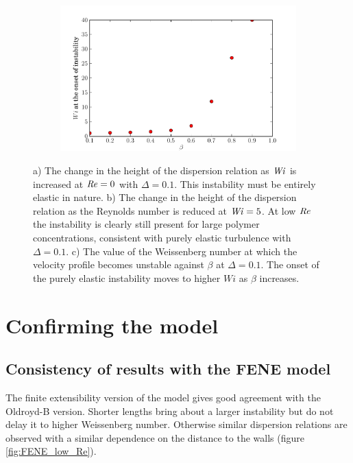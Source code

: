 \documentclass{jfm}
\newcommand\Wi{\mbox{\textit{Wi}}}
\newcommand\Rey{\mbox{\textit{Re}}}  %
\begin{document}
\begin{figure}
\begin{subfigure}[b]{0.48\textwidth}
    \centering
    \includegraphics[width=\textwidth]{KH_onset_beta_Wi}
    \caption{}
    \label{fig:KH_elastic_onset}
\end{subfigure}
\caption{a) The change in the height of the dispersion relation as $\Wi$ is increased at $\Rey = 0$ with $\Delta = 0.1$. This instability must be entirely elastic in nature. b) The change in the height of the dispersion relation as the Reynolds number is reduced at $\Wi=5$. At low $\Rey$ the instability is clearly still present for large polymer concentrations, consistent with purely elastic turbulence with $\Delta = 0.1$.  c) The value of the Weissenberg number at which the velocity profile becomes unstable against $\beta$ at $\Delta = 0.1$. The onset of the purely elastic instability moves to higher $Wi$ as $\beta$ increases.}
\end{figure}

\section{Confirming the model}

\subsection{Consistency of results with the FENE model}

The finite extensibility version of the model gives good agreement with the Oldroyd-B version. Shorter lengths bring about a larger instability but do not delay it to higher Weissenberg number. Otherwise similar dispersion relations are observed with a similar dependence on the distance to the walls (figure \ref{fig:FENE_low_Re}).
\end{document}
